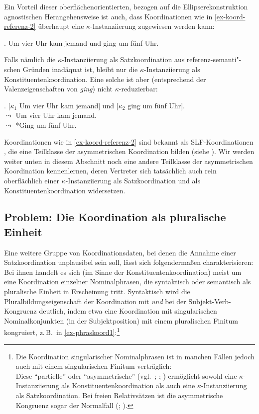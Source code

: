 Ein Vorteil dieser oberflächenorientierten, bezogen auf die Ellipserekonstruktion agnostischen Herangehensweise ist auch, dass Koordinationen wie in \ref{ex-koord-referenz-2} überhaupt eine $\kappa$-Instan\-ziierung zugewiesen werden kann:

\ex. \label{ex-koord-referenz-2}Um vier Uhr kam jemand und ging um fünf Uhr.

Falls nämlich die $\kappa$-Instanziierung als Satzkoordination aus referenz-semanti"-schen Gründen inadäquat ist, bleibt nur die $\kappa$-Instanziierung als Konstituentenkoordination. Eine solche ist aber (entsprechend der Valenzeigenschaften von {\it ging}) nicht $\kappa$-reduzierbar:

\ex. [$\kappa_1$ Um vier Uhr kam jemand] und [$\kappa_2$ ging um fünf Uhr]. \\
$\leadsto$ Um vier Uhr kam jemand. \\
$\leadsto$ *Ging um fünf Uhr.

Koordinationen wie in \ref{ex-koord-referenz-2} sind bekannt als SLF-Koordinationen \citep{Hoehle:83}, die eine Teilklasse der asymmetrischen Koordination bilden (siehe \citealt[1f]{Reich:09}). Wir werden weiter unten in diesem Abschnitt noch eine andere Teilklasse der asymmetrischen Koordination kennenlernen, deren Vertreter sich tatsächlich auch rein oberflächlich einer $\kappa$-Instanziierung als Satzkoordination und als Konstituentenkoordination widersetzen.   


\subsection{Problem: Die Koordination als pluralische Einheit} \label{sec-plural}

Eine weitere Gruppe von Koordinationsdaten, bei denen die Annahme einer Satzkoordination unplausibel sein soll, lässt sich folgenderma\ss en charakterisieren: Bei ihnen handelt es sich (im Sinne der Konstituentenkoordination) meist um eine Koordination einzelner Nominalphrasen, die syntaktisch oder semantisch als pluralische Einheit in Erscheinung tritt. Syntaktisch wird die Pluralbildungseigenschaft der Koordination mit {\it und} bei der Subjekt-Verb-Kongruenz deutlich, indem etwa eine Koordination mit singularischen Nominalkonjunkten (in der Subjektposition) mit einem pluralischen Finitum kongruiert, z.\,B.\ in \ref{ex-phraskoord1}:\footnote{Die Koordination singularischer Nominalphrasen ist in manchen Fällen jedoch auch mit einem singularischen Finitum verträglich:\\
Diese "`partielle"' oder "`asymmetrische"'  (vgl.\ \citealt{Munn:00}; \citealt{Lorimor:07}; \citealt{Steiner:09}) ermöglicht sowohl eine $\kappa$-Instanziierung als Konstituentenkoordination als auch eine $\kappa$-Instanziierung als Satzkoordination. Bei freien Relativsätzen ist die asymmetrische Kongruenz sogar der Normalfall (\citealt[143]{Oppenrieder:91}; \citealt[Abschnitt~10.4.1.1]{Mueller:99}).}

